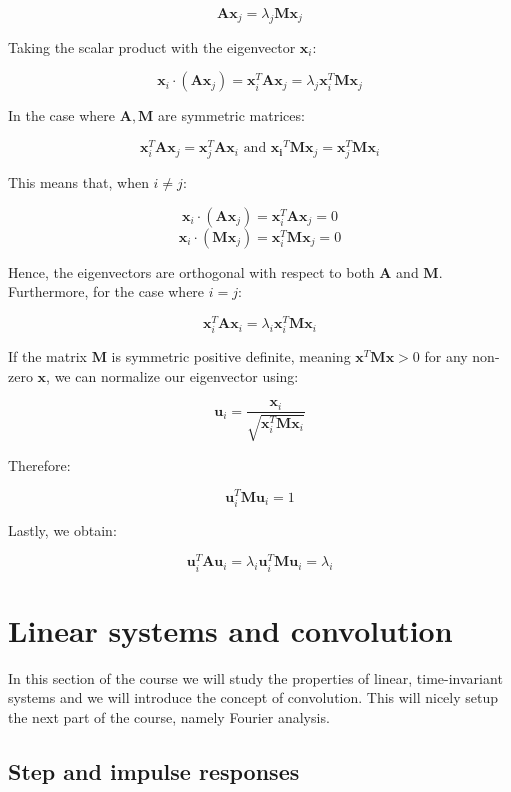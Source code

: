 \documentclass[12pt]{article}
\begin{document}
\[ \mathbf{Ax}_j = \lambda_j\mathbf{Mx}_j \]

Taking the scalar product with the eigenvector $\mathbf{x}_i$:

\[ \mathbf{x}_i \cdot (\mathbf{Ax}_j) = \mathbf{x}_i^T\mathbf{Ax}_j = \lambda_j\mathbf{x}_i^T\mathbf{Mx}_j \]

In the case where $\mathbf{A, M}$ are symmetric matrices:

\[ \mathbf{x}_i^T\mathbf{Ax}_j = \mathbf{x}_j^T\mathbf{Ax}_i \text{   and   } \mathbf{x_i}^T\mathbf{Mx}_j = \mathbf{x}_j^T\mathbf{Mx}_i\]

This means that, when $i \neq j$:

\[ \mathbf{x}_i \cdot (\mathbf{Ax}_j) = \mathbf{x}_i^T\mathbf{Ax}_j = 0 \]
\[ \mathbf{x}_i \cdot (\mathbf{Mx}_j) = \mathbf{x}_i^T\mathbf{Mx}_j = 0 \]

Hence, the eigenvectors are orthogonal with respect to both $\mathbf{A}$ and $\mathbf{M}$. Furthermore, for the case where $i = j$:

\[ \mathbf{x}_i^T\mathbf{Ax}_i = \lambda_i\mathbf{x}_i^T\mathbf{Mx}_i \]

If the matrix $\mathbf{M}$ is symmetric positive definite, meaning $\mathbf{x}^T\mathbf{Mx} > 0$ for any non-zero $\mathbf{x}$, we can normalize our eigenvector using:

\[ \mathbf{u}_i = \frac{\mathbf{x}_i}{\sqrt{\mathbf{x}_i^T\mathbf{Mx}_i}} \]

Therefore:

\[ \mathbf{u}_i^T\mathbf{Mu}_i = 1 \]

Lastly, we obtain:

\[ \mathbf{u}_i^T\mathbf{Au}_i = \lambda_i\mathbf{u}_i^T\mathbf{Mu}_i = \lambda_i \]

\newpage

\section{Linear systems and convolution}

In this section of the course we will study the properties of linear, time-invariant systems and we will introduce the concept of convolution. This will nicely setup the next part of the course, namely Fourier analysis.

\subsection{Step and impulse responses}
\end{document}
